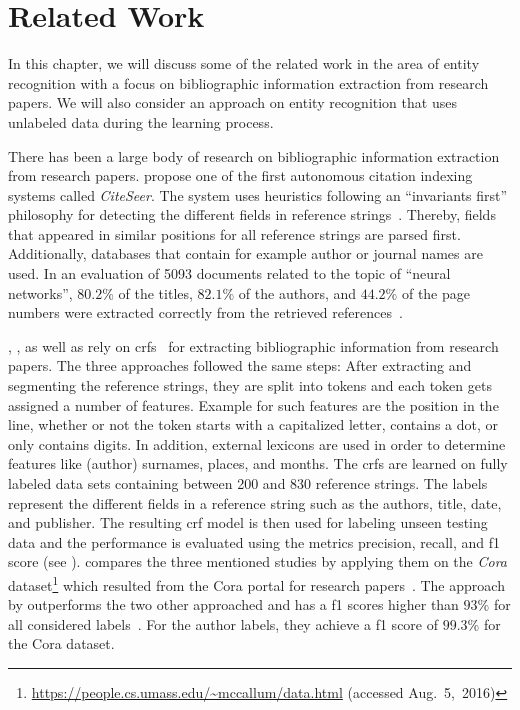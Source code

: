\chapter{Related Work}\label{cha:related-work}
In this chapter, we will discuss some of the related work in the area of entity recognition with a focus on bibliographic information extraction from research papers.
We will also consider an approach on entity recognition that uses unlabeled data during the learning process.

\bigskip

There has been a large body of research on bibliographic information extraction from research papers.
\citet{giles1998citeseer} propose one of the first autonomous citation indexing systems called \emph{CiteSeer}.
The system uses heuristics following an ``invariants first'' philosophy for detecting the different fields in reference strings~\citep{giles1998citeseer}.
Thereby, fields that appeared in similar positions for all reference strings are parsed first.
Additionally, databases that contain for example author or journal names are used.
In an evaluation of \num{5093} documents related to the topic of ``neural networks'', $80.2\%$ of the titles, $82.1\%$ of the authors, and $44.2\%$ of the page numbers were extracted correctly from the retrieved references~\cite{giles1998citeseer}.

\citet{peng2004accurate}, \citet{councill2008parscit}, as well as \citet{groza2012reference} rely on \glspl{crf}~\citep{lafferty2001conditional} for extracting bibliographic information from research papers.
The three approaches followed the same steps:
After extracting and segmenting the reference strings, they are split into tokens and each token gets assigned a number of features.
Example for such features are the position in the line, whether or not the token starts with a capitalized letter, contains a dot, or only contains digits.
In addition, external lexicons are used in order to determine features like (author) surnames, places, and months.
The \glspl{crf} are learned on fully labeled data sets containing between 200 and 830 reference strings.
The labels represent the different fields in a reference string such as the authors, title, date, and publisher.
The resulting \gls{crf} model is then used for labeling unseen testing data and the performance is evaluated using the metrics \gls{precision}, \gls{recall}, and \gls{f1 score} (see ).
\citet{groza2012reference} compares the three mentioned studies by applying them on the \textit{Cora} dataset\footnote{\url{https://people.cs.umass.edu/~mccallum/data.html} (accessed Aug.~5,~2016)} which resulted from the Cora portal for research papers~\citep{mccallum2000automating}.
The approach by \citet{groza2012reference} outperforms the two other approached and has a \glspl{f1 score} higher than $93\%$ for all considered labels~\citep{groza2012reference}.
For the author labels, they achieve a \gls{f1 score} of $99.3\%$ for the Cora dataset.

